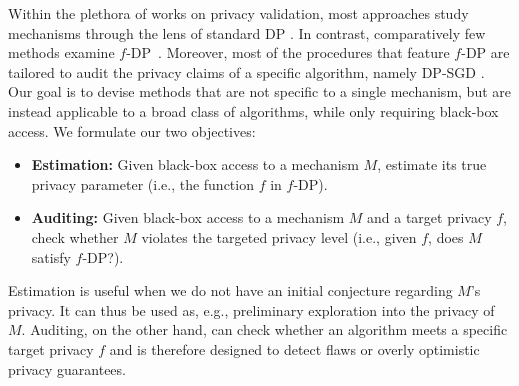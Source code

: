 Within the plethora of works on privacy validation, most approaches study mechanisms through the lens of standard DP \cite{StatDP, DP-Finder, CheckDP, DP-Sniper, Dette2022, Liu2019, Lu2024, Chadha2023, Lokna2023, Kifer2017, Kifer2019, Tschantz2011, Barthe2012,Barthe2014, Barthe2015, Barthe2016, Barthe2016_B}. In contrast, comparatively few methods examine $f$-DP~\cite{Nasr2023,Annamalai2024, Annamalai2024_B, Annamalai2024_C, Mahloujifar2024,Koskela2024}. Moreover, most of the procedures that feature $f$-DP are tailored to audit the privacy claims of a specific algorithm, namely DP-SGD \cite{Nasr2023,Annamalai2024,Annamalai2024_B,Annamalai2024_C}. Our goal is to devise methods that are not specific to a single mechanism, but are instead applicable to a broad class of algorithms, while only requiring black-box access. We formulate our two objectives: \\[-3.5ex]%
\begin{itemize}
    \item \textbf{Estimation:} Given black-box access to a mechanism $M$, estimate its true privacy parameter (i.e., the function $f$ in $f$-DP).\\[-3.5ex]
    \item \textbf{Auditing:} Given black-box access to a mechanism $M$ and a target privacy  $f$, check whether $M$ violates the targeted privacy level (i.e., given $f$, does $M$ satisfy $f$-DP?).\\[-3.5ex]
\end{itemize}
Estimation is useful  when we do not have an initial conjecture regarding $M$'s privacy. It can thus be used as, e.g.,  preliminary exploration into the privacy of $M$. Auditing, on the other hand, can check whether an algorithm meets a specific target privacy  $f$ and is therefore designed to detect flaws or overly optimistic privacy guarantees.





